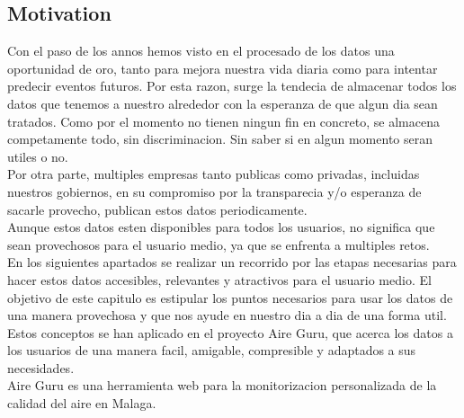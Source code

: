 \subsection*{Motivation}
Con el paso de los annos hemos visto en el procesado de los datos una oportunidad de oro, 
tanto para mejora nuestra vida diaria como para intentar predecir
eventos futuros. Por esta razon, surge la tendecia de almacenar todos los datos que tenemos 
a nuestro alrededor con la esperanza de que algun dia sean tratados.
Como por el momento no tienen ningun fin en concreto, se almacena competamente todo, sin discriminacion.
Sin saber si en algun momento seran utiles o no.\\

Por otra parte, multiples empresas tanto publicas como privadas, incluidas nuestros gobiernos, 
en su compromiso por la transparecia y/o esperanza de sacarle provecho, publican estos datos 
periodicamente.\\

Aunque estos datos esten disponibles para todos los usuarios, no significa que sean provechosos para el 
usuario medio, ya que se enfrenta a multiples retos.\\

En los siguientes apartados se realizar un recorrido por las etapas necesarias para hacer estos datos
accesibles, relevantes y atractivos para el usuario medio.
El objetivo de este capitulo es estipular los puntos necesarios para usar los datos de una manera provechosa y
que nos ayude en nuestro dia a dia de una forma util. Estos conceptos se han aplicado en el proyecto Aire Guru, 
que acerca los datos a los usuarios de una manera facil, amigable, compresible y adaptados a sus necesidades.\\

Aire Guru es una herramienta web para la monitorizacion personalizada de la calidad del aire en Malaga.


